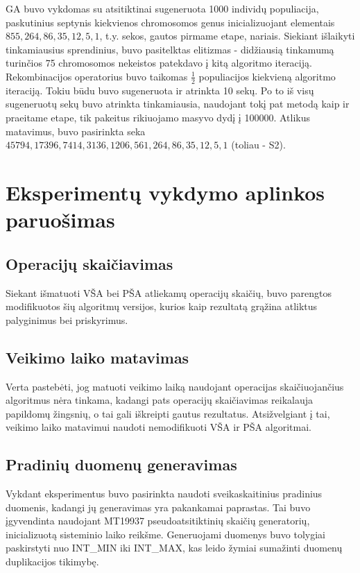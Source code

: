 \documentclass{VUMIFInfKursinis}
\begin{document}
GA buvo vykdomas su atsitiktinai sugeneruota 1000 individų populiacija,
paskutinius septynis kiekvienos chromosomos genus inicializuojant elementais $855, 264, 86, 35, 12, 5, 1$, t.y. sekos, gautos pirmame etape, nariais.
Siekiant išlaikyti tinkamiausius sprendinius, buvo pasitelktas elitizmas - didžiausią tinkamumą turinčios 75 chromosomos nekeistos
patekdavo į kitą algoritmo iteraciją.
Rekombinacijos operatorius buvo taikomas $\frac{1}{2}$ populiacijos kiekvieną algoritmo iteraciją.
Tokiu būdu buvo sugeneruota ir atrinkta 10 sekų.
Po to iš visų sugeneruotų sekų buvo atrinkta tinkamiausia, naudojant tokį pat metodą kaip ir praeitame etape, tik pakeitus rikiuojamo masyvo dydį į 100000.
Atlikus matavimus, buvo pasirinkta seka $45794, 17396, 7414, 3136, 1206, 561, 264, 86, 35, 12, 5, 1$ (toliau - S2).


\section{Eksperimentų vykdymo aplinkos paruošimas}

\subsection{Operacijų skaičiavimas}

Siekant išmatuoti VŠA bei PŠA atliekamų operacijų skaičių,
buvo parengtos modifikuotos šių algoritmų versijos, kurios kaip rezultatą grąžina atliktus palyginimus bei priskyrimus.

\subsection{Veikimo laiko matavimas}

Verta pastebėti, jog matuoti veikimo laiką naudojant operacijas skaičiuojančius algoritmus nėra tinkama,
kadangi pats operacijų skaičiavimas reikalauja papildomų žingsnių, o tai gali iškreipti gautus rezultatus.
Atsižvelgiant į tai, veikimo laiko matavimui naudoti nemodifikuoti VŠA ir PŠA algoritmai. 

\subsection{Pradinių duomenų generavimas}

Vykdant eksperimentus buvo pasirinkta naudoti sveikaskaitinius pradinius duomenis, kadangi jų generavimas yra pakankamai paprastas.
Tai buvo įgyvendinta naudojant MT19937 pseudoatsitiktinių skaičių generatorių, inicializuotą sisteminio laiko reikšme.
Generuojami duomenys buvo tolygiai paskirstyti nuo INT\_MIN iki INT\_MAX, kas leido žymiai sumažinti duomenų duplikacijos tikimybę.
\end{document}
